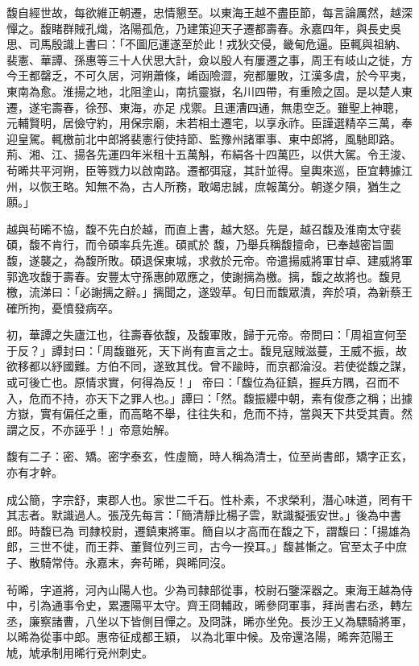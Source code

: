 \begin{pinyinscope}
 馥自經世故，每欲維正朝遷，忠情懇至。以東海王越不盡臣節，每言論厲然，越深憚之。馥睹群賊孔熾，洛陽孤危，乃建策迎天子遷都壽春。永嘉四年，與長史吳思、司馬殷識上書曰：「不圖厄運遂至於此！戎狄交侵，畿甸危逼。臣輒與祖納、裴憲、華譚、孫惠等三十人伏思大計，僉以殷人有屢遷之事，周王有岐山之徙，方今王都罄乏，不可久居，河朔蕭條，崤函險澀，宛都屢敗，江漢多虞，於今平夷，東南為愈。淮揚之地，北阻塗山，南抗靈嶽，名川四帶，有重險之固。是以楚人東遷，遂宅壽春，徐邳、東海，亦足
 戍禦。且運漕四通，無患空乏。雖聖上神聰，元輔賢明，居儉守約，用保宗廟，未若相土遷宅，以享永祚。臣謹選精卒三萬，奉迎皇駕。輒檄前北中郎將裴憲行使持節、監豫州諸軍事、東中郎將，風馳即路。荊、湘、江、揚各先運四年米租十五萬斛，布絹各十四萬匹，以供大駕。令王浚、茍晞共平河朔，臣等戮力以啟南路。遷都弭寇，其計並得。皇輿來巡，臣宜轉據江州，以恢王略。知無不為，古人所務，敢竭忠誠，庶報萬分。朝遂夕隕，猶生之願。」



 越與茍晞不協，馥不先白於越，而直上書，越大怒。先是，越召馥及淮南太守裴碩，馥不肯行，而令碩率兵先進。碩貳於
 馥，乃舉兵稱馥擅命，已奉越密旨圖馥，遂襲之，為馥所敗。碩退保東城，求救於元帝。帝遣揚威將軍甘卓、建威將軍郭逸攻馥于壽春。安豐太守孫惠帥眾應之，使謝摛為檄。摛，馥之故將也。馥見檄，流涕曰：「必謝摛之辭。」摛聞之，遂毀草。旬日而馥眾潰，奔於項，為新蔡王確所拘，憂憤發病卒。



 初，華譚之失廬江也，往壽春依馥，及馥軍敗，歸于元帝。帝問曰：「周祖宣何至于反？」譚封曰：「周馥雖死，天下尚有直言之士。馥見寇賊滋蔓，王威不振，故欲移都以紓國難。方伯不同，遂致其伐。曾不踰時，而京都淪沒。若使從馥之謀，或可後亡也。原情求實，何得為反！」
 帝曰：「馥位為征鎮，握兵方隅，召而不入，危而不持，亦天下之罪人也。」譚曰：「然。馥振纓中朝，素有俊彥之稱；出據方嶽，實有偏任之重，而高略不舉，往往失和，危而不持，當與天下共受其責。然謂之反，不亦誣乎！」帝意始解。



 馥有二子：密、矯。密字泰玄，性虛簡，時人稱為清士，位至尚書郎，矯字正玄，亦有才幹。



 成公簡，字宗舒，東郡人也。家世二千石。性朴素，不求榮利，潛心味道，罔有干其志者。默識過人。張茂先每言：「簡清靜比楊子雲，默識擬張安世。」後為中書郎。時馥已為
 司隸校尉，遷鎮東將軍。簡自以才高而在馥之下，謂馥曰：「揚雄為郎，三世不徙，而王莽、董賢位列三司，古今一揆耳。」馥甚慚之。官至太子中庶子、散騎常侍。永嘉末，奔茍晞，與晞同沒。



 茍晞，字道將，河內山陽人也。少為司隸部從事，校尉石鑒深器之。東海王越為侍中，引為通事令史，累遷陽平太守。齊王冏輔政，晞參冏軍事，拜尚書右丞，轉左丞，廉察諸曹，八坐以下皆側目憚之。及冏誅，晞亦坐免。長沙王乂為驃騎將軍，以晞為從事中郎。惠帝征成都王穎，
 以為北軍中候。及帝還洛陽，晞奔范陽王虓，虓承制用晞行兗州刺史。




\end{pinyinscope}
